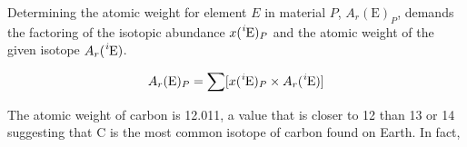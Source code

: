 Determining the atomic weight for element $E$ in material $P$,
$A_r(\mathrm E)_P$, demands the factoring of the isotopic abundance
$x(\mathrm { \ce{^{i}E} })_P$ and the atomic weight of the given isotope
$A_r(\mathrm { \ce{^i}E })$.

$$A_r(\mathrm E)_P = \sum [x(\mathrm { \ce{^i}E })_P \times A_r( \mathrm { \ce{^i}E } )]$$

The atomic weight of carbon is \num{12.011}\cite{atomic-weights-2013}, a value
that is closer to \num{12} than \num{13} or \num{14} suggesting that
C is the most common isotope of carbon found on Earth. In fact,




